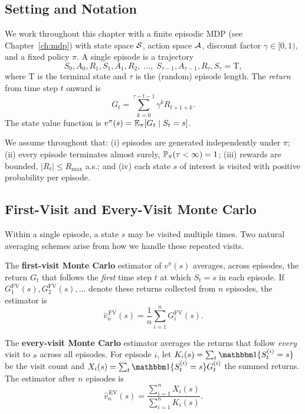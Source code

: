 \subsection*{Setting and Notation}

We work throughout this chapter with a finite episodic MDP (see Chapter~\ref{ch:mdp}) with state space $\mathcal{S}$, action space $\mathcal{A}$, discount factor $\gamma \in [0,1)$, and a fixed policy $\pi$.  A single episode is a trajectory
\[
  S_0, A_0, R_1, S_1, A_1, R_2, \;\dots,\; S_{\tau-1}, A_{\tau-1}, R_{\tau}, S_{\tau} = \mathrm{T},
\]
where $\mathrm{T}$ is the terminal state and $\tau$ is the (random) episode length.  The \emph{return} from time step $t$ onward is
\begin{equation}
  \label{eq:mc-return}
  G_t = \sum_{k=0}^{\tau - t - 1} \gamma^k R_{t+1+k}.
\end{equation}
The state value function is $v^{\pi}(s) = \operatorname{\mathbb{E}}_\pi[G_t \mid S_t = s]$.

We assume throughout that: (i) episodes are generated independently under $\pi$; (ii) every episode terminates almost surely, $\mathbb{P}_\pi(\tau < \infty) = 1$; (iii) rewards are bounded, $|R_t| \le R_{\max}$ a.s.; and (iv) each state $s$ of interest is visited with positive probability per episode.

\subsection*{First-Visit and Every-Visit Monte Carlo}

Within a single episode, a state $s$ may be visited multiple times.  Two natural averaging schemes arise from how we handle these repeated visits.

\begin{definition}
\label{def:first-visit-mc}
The \textbf{first-visit Monte Carlo} estimator of $v^\pi(s)$ averages, across episodes, the return $G_t$ that follows the \emph{first} time step $t$ at which $S_t = s$ in each episode.  If $G_1^{\mathrm{FV}}(s), G_2^{\mathrm{FV}}(s), \dots$ denote these returns collected from $n$ episodes, the estimator is
\begin{equation}
  \label{eq:fv-estimator}
  \widehat{v}_n^{\,\mathrm{FV}}(s) = \frac{1}{n} \sum_{i=1}^{n} G_i^{\mathrm{FV}}(s).
\end{equation}
\end{definition}

\begin{definition}
\label{def:every-visit-mc}
The \textbf{every-visit Monte Carlo} estimator averages the returns that follow \emph{every} visit to $s$ across all episodes.  For episode $i$, let $K_i(s) = \sum_t \ind\{S_t^{(i)} = s\}$ be the visit count and $X_i(s) = \sum_t \ind\{S_t^{(i)} = s\} G_t^{(i)}$ the summed returns.  The estimator after $n$ episodes is
\begin{equation}
  \label{eq:ev-estimator}
  \widehat{v}_n^{\,\mathrm{EV}}(s) = \frac{\sum_{i=1}^{n} X_i(s)}{\sum_{i=1}^{n} K_i(s)}.
\end{equation}
\end{definition}

